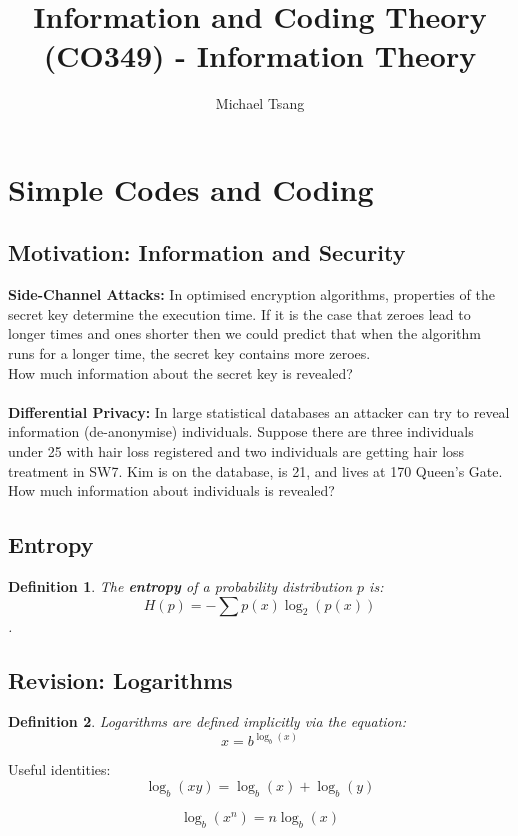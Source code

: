 \documentclass[11pt]{article}
\title{Information and Coding Theory (CO349) - Information Theory}
\author{Michael Tsang}
\newtheorem{defn}{Definition}
\begin{document}
\maketitle

\section{Simple Codes and Coding}
\subsection{Motivation: Information and Security}
\textbf{Side-Channel Attacks:}
In optimised encryption algorithms, properties of the secret key determine the execution time.
If it is the case that zeroes lead to longer times and ones shorter then we could predict that when the algorithm runs for a longer time, the secret key contains more zeroes. \\
How much information about the secret key is revealed?
\\ \\
\textbf{Differential Privacy:}
In large statistical databases an attacker can try to reveal information (de-anonymise) individuals.
Suppose there are three individuals under 25 with hair loss registered and two individuals are getting hair loss treatment in SW7.
Kim is on the database, is 21, and lives at 170 Queen's Gate. \\
How much information about individuals is revealed?

\subsection{Entropy}
\begin{defn}
  The \textbf{entropy} of a probability distribution $p$ is:
  \[ H(p) = - \sum p(x) \log_{2} (p(x)) \].
\end{defn}

\subsection{Revision: Logarithms}
\begin{defn}
  Logarithms are defined implicitly via the equation:
  \[ x = b^{\log_{b} (x)}\]
\end{defn}

Useful identities:
\[ \log_{b} (xy) = \log_{b} (x) + \log_{b} (y) \]

\[ \log_{b} (x^{n}) = n \log_{b} (x) \]
\end{document}
